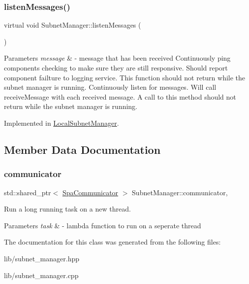 \subsubsection{\texorpdfstring{listen\+Messages()}{listenMessages()}}
{\footnotesize\ttfamily virtual void Subnet\+Manager\+::listen\+Messages (\begin{DoxyParamCaption}{ }\end{DoxyParamCaption})\hspace{0.3cm}{\ttfamily [pure virtual]}}


\begin{DoxyParams}{Parameters}
{\em message} & -\/ message that has been received Continuously ping components checking to make sure they are still responsive. Should report component failture to logging service. This function should not return while the subnet manager is running. Continuously listen for messages. Will call receive\+Message with each received message. A call to this method should not return while the subnet manager is running. \\
\hline
\end{DoxyParams}


Implemented in \hyperlink{classLocalSubnetManager_a8cd2838196edcd75a77f532bce15c2fd}{Local\+Subnet\+Manager}.



\subsection{Member Data Documentation}
\mbox{\label{classSubnetManager_acb58a845a46fa4943cb2b9d4a56c9b0f}} 
\subsubsection{\texorpdfstring{communicator}{communicator}}
{\footnotesize\ttfamily std\+::shared\+\_\+ptr$<$ \hyperlink{classSpaCommunicator}{Spa\+Communicator} $>$ Subnet\+Manager\+::communicator\hspace{0.3cm}{\ttfamily [static]}, {\ttfamily [protected]}}



Run a long running task on a new thread. 


\begin{DoxyParams}{Parameters}
{\em task} & -\/ lambda function to run on a seperate thread \\
\hline
\end{DoxyParams}


The documentation for this class was generated from the following files\+:\begin{DoxyCompactItemize}
\item 
lib/subnet\+\_\+manager.\+hpp\item 
lib/subnet\+\_\+manager.\+cpp\end{DoxyCompactItemize}
